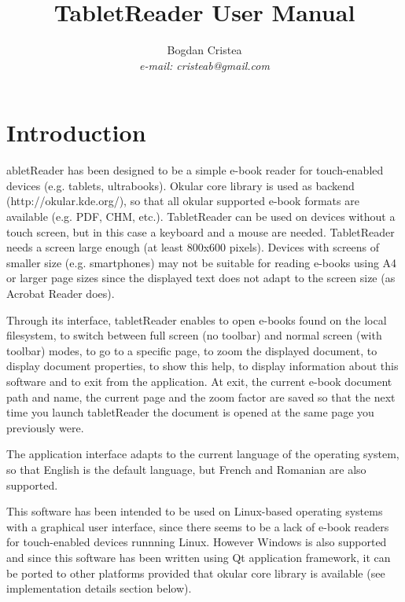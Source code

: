 \documentclass[journal,12pt]{IEEEtran}
\begin{document}
\title{TabletReader User Manual}
\author{Bogdan Cristea\\\textit{e-mail: cristeab@gmail.com}}

\maketitle

\section{Introduction}

abletReader has been designed to be a simple e-book reader for touch-enabled devices (e.g. tablets, ultrabooks). Okular core library is used as backend (http://okular.kde.org/), so that all okular supported e-book formats are available (e.g. PDF, CHM, etc.). TabletReader can be used on devices without a touch screen, but in this case a keyboard and a mouse are needed. TabletReader needs a screen large enough (at least 800x600 pixels). Devices with screens of smaller size (e.g. smartphones) may not be suitable for reading e-books using A4 or larger page sizes since the displayed text does not adapt to the screen size (as Acrobat Reader does).

Through its interface, tabletReader enables to open e-books found on the local filesystem, to switch between full screen (no toolbar) and normal screen (with toolbar) modes, to go to a specific page, to zoom the displayed document, to display document properties, to show this help, to display information about this software and to exit from the application. At exit, the current e-book document path and name, the current page and the zoom factor are saved so that the next time you launch tabletReader the document is opened at the same page you previously were. 

The application interface adapts to the current language of the operating system, so that English is the default language, but French and Romanian are also supported.

This software has been intended to be used on Linux-based operating systems with a graphical user interface, since there seems to be a lack of e-book readers for touch-enabled devices runnning Linux. However Windows is also supported and since this software has been written using Qt application framework, it can be ported to other platforms provided that okular core library is available (see implementation details section below).
\end{document}
